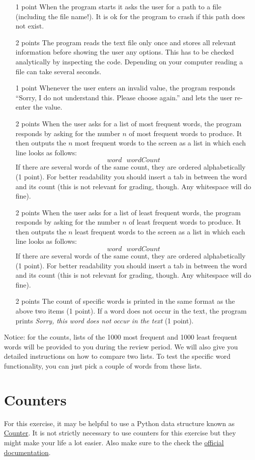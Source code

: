 \documentclass[11pt, leqno, a4paper]{article}
\begin{document}
\begin{itemize}
\item[1 point] When the program starts it asks the user for a path to a file (including the file name!). It is ok for the program to crash if this path does not exist.
\item[2 points] The program reads the text file only once and stores all relevant information before showing the user any options. This has to
be checked analytically by inspecting the code. Depending on your computer reading a file can take several seconds.
\item[1 point] Whenever the user enters an invalid value, the program responds ``Sorry, I do not understand this. Please choose again.'' and lets the
user re-enter the value.
\item[2 points] When the user asks for a list of most frequent words, the program responds by asking for the number $ n $ of most frequent words to 
produce. It then outputs the $ n $ most frequent words to the screen as a list in which each line looks as follows:
$$ word~~~wordCount $$
If there are several words of the same count, they are ordered alphabetically (1 point). For better readability
you should insert a tab in between the word and its count (this is not relevant for grading, though. Any whitespace will do fine).
\item[2 points] When the user asks for a list of least frequent words, the program responds by asking for the number $ n $ of least frequent words to 
produce. It then outputs the $ n $ least frequent words to the screen as a list in which each line looks as follows:
$$ word~~~wordCount $$
If there are several words of the same count, they are ordered alphabetically (1 point).  For better readability
you should insert a tab in between the word and its count (this is not relevant for grading, though. Any whitespace will do fine).
\item[2 points] The count of specific words is printed in the same format as the above two items (1 point). If a word does not occur in the text, the program prints \textit{Sorry, this
word does not occur in the text} (1 point).
\end{itemize}

Notice: for the counts, lists of the 1000 most frequent and 1000 least frequent words will be provided to you during the review period. We will also give
you detailed instructions on how to compare two lists. To test the specific word functionality, you can just pick a couple of words from these lists.

\enlargethispage{1cm}
\section{Counters}
For this exercise, it may be helpful to use a Python data structure known as 
\href{https://pymotw.com/3/collections/counter.html}{Counter}. It is not strictly necessary to use counters
for this exercise but they might make your life a lot easier. Also make sure to the check the
\href{https://docs.python.org/3/library/collections.html#collections.Counter}{official documentation}.
\end{document}
